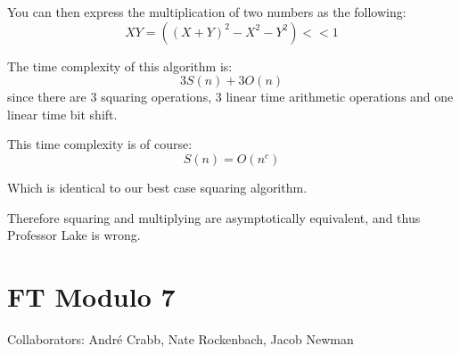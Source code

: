 \documentclass[11pt]{article}
\begin{document}
You can then express the multiplication of two numbers as the following:
\begin{equation*}
XY = ((X + Y)^2 - X^2 - Y^2) << 1
\end{equation*}

The time complexity of this algorithm is:
\begin{equation*}
3S(n) + 3O(n)
\end{equation*}
since there are 3 squaring operations, 3 linear time arithmetic operations and
one linear time bit shift.

This time complexity is of course:
\begin{equation*}
S(n) = O(n^c)
\end{equation*}

Which is identical to our best case squaring algorithm. 

Therefore squaring and multiplying are asymptotically equivalent, and thus
Professor Lake is wrong.

\newpage
\section{FT Modulo 7}
Collaborators: Andr\'e Crabb, Nate Rockenbach, Jacob Newman
\end{document}
